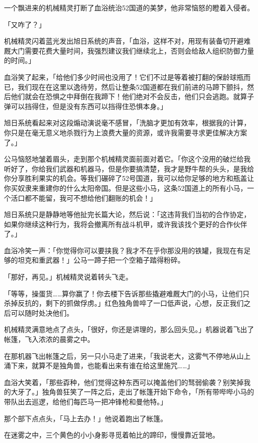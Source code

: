 一个飘进来的机械精灵打断了血浴统治52国道的美梦，他非常恼怒的瞪着入侵者。

「又咋了？」

机械精灵闪着蓝光发出旭日系统的声音，「血浴，这样不对，用现有装备切开避难厩大门需要花费大量时间，我强烈建议我们继续北上，否则会给敌人组织防御力量的时间。」

血浴笑了起来，「给他们多少时间也没用了！它们不过是等着被打翻的保龄球瓶而已，我们现在在这里以逸待劳，然后让整条52国道都在我们前进的马蹄下颤抖，然后他们就会在恐惧之中拜倒在我蹄下！他们绝对不会反击，他们只会逃跑。就算子弹可以挡得住，但是没有东西可以挡得住恐惧本身。」

旭日系统看起来对这段煽动演说毫不感冒，「洗脑才更加有效率，根据我的计算，你只是在毫无意义地杀戮行为上浪费大量的资源，或许我需要寻求更佳解决方案了。」

公马恼怒地皱着眉头，走到那个机械精灵面前面对着它。「你这个没用的破烂给我听好了，你给我们武器和机器马，但是你要搞清楚，我才是野牛帮的头头，是我给你分享胜利果实的机会。等我们碾碎了52号国道，我可以给你足够的地方和瓶盖让你买奴隶来重建你的什么太阳帝国。但是这些小马，这条52国道上的所有小马，一个活口都不能留，我可不想给他们翻账的机会！」

旭日系统只是静静地等他扯完长篇大论，然后说：「这违背我们当初的合作协定，如果你继续这种行为，我将会撤离所有战斗机甲，或许我该找个更好的合作伙伴了。」

血浴冷笑一声：「你觉得你可以要挟我？我才不在乎你那没用的铁罐，我现在有足够的坦克和重武器！」公马一蹄子把一个空箱子踏得粉碎。

「那好，再见。」机械精灵说着转头飞走。

「等等，操蛋货……算你赢了！你去楼下告诉那些撬避难厩大门的小马，让他们只杀掉反抗的，剩下的抓做俘虏。」红色独角兽啐了一口低声说，心想，反正我们之后可以随时处决他们。

机械精灵满意地点了点头，「很好，你还是讲理的，那么回头见。」机器说着飞出了帐篷，飞入浓浓的晨雾之中。

在那机器飞出帐篷之后，另一只小马走了进来，「我说老大，这雾气不停地从山上涌下来，就算不是独角兽，也能看出来有谁在给这里施咒……」

血浴大笑着，「那些孬种，他们觉得这种东西可以掩盖他们的驽弱偷袭？别笑掉我的大牙了。」独角兽狂笑了一阵之后，走出了帐篷开始下命令，「所有带哔哔小马的带队出去巡逻，给他们每匹马一把冲锋枪和曼他特。」

那个部下点点头，「马上去办！」他说着跑出了帐篷。

在迷雾之中，三个黄色的小小身影寻觅着帕比的蹄印，慢慢靠近营地。

